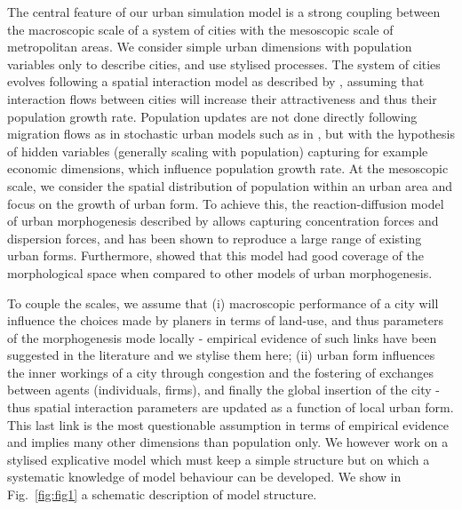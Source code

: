 \documentclass[referee,lineno,pdflatex,sn-apa]{sn-jnl}
\begin{document}
The central feature of our urban simulation model is a strong coupling between the macroscopic scale of a system of cities with the mesoscopic scale of metropolitan areas. We consider simple urban dimensions with population variables only to describe cities, and use stylised processes. The system of cities evolves following a spatial interaction model as described by \cite{raimbault2020indirect}, assuming that interaction flows between cities will increase their attractiveness and thus their population growth rate. Population updates are not done directly following migration flows as in stochastic urban models such as in \cite{james2018zipf}, but with the hypothesis of hidden variables (generally scaling with population) capturing for example economic dimensions, which influence population growth rate. At the mesoscopic scale, we consider the spatial distribution of population within an urban area and focus on the growth of urban form. To achieve this, the reaction-diffusion model of urban morphogenesis described by \cite{raimbault2018calibration} allows capturing concentration forces and dispersion forces, and has been shown to reproduce a large range of existing urban forms. Furthermore, \cite{raimbault2020comparison} showed that this model had good coverage of the morphological space when compared to other models of urban morphogenesis.

To couple the scales, we assume that (i) macroscopic performance of a city will influence the choices made by planers in terms of land-use, and thus parameters of the morphogenesis mode locally - empirical evidence of such links have been suggested in the literature \cite{joy2015toronto} and we stylise them here; (ii) urban form influences the inner workings of a city through congestion and the fostering of exchanges between agents (individuals, firms), and finally the global insertion of the city - thus spatial interaction parameters are updated as a function of local urban form. This last link is the most questionable assumption in terms of empirical evidence and implies many other dimensions than population only. We however work on a stylised explicative model which must keep a simple structure but on which a systematic knowledge of model behaviour can be developed. We show in Fig.~\ref{fig:fig1} a schematic description of model structure.
\end{document}
